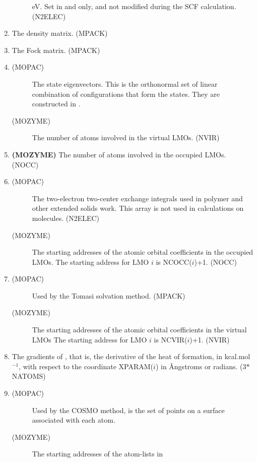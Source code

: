 \begin{enumerate}
\begin{description}
eV. Set in  and  only, and not modified during the
SCF calculation. (N2ELEC)
\end{description}
\item {} The density matrix. (MPACK)
\item {} The Fock matrix. (MPACK)
\item 
\begin{description}
\item[(MOPAC) ] The state eigenvectors.  This is the
orthonormal set of linear combination of configurations that form
the states. They are constructed in . 
\item[(MOZYME) ]
The number of atoms involved in the virtual LMOs.
(NVIR)
\end{description}
\item {\bf (MOZYME) }  The number of atoms involved in the occupied
LMOs. (NOCC)
\item 
\begin{description}
\item[(MOPAC) ] The two-electron two-center exchange integrals used
in polymer and other extended solids work.  This array is not used in
calculations on molecules.  (N2ELEC) 
\item[(MOZYME) ] The starting addresses of the atomic orbital
coefficients in the occupied LMOs.  The starting address for LMO $i$ is
NCOCC($i$)+1. (NOCC)
\end{description}
\item 
\begin{description}
\item[(MOPAC) ] Used by the Tomasi solvation method. (MPACK)
\item[(MOZYME) ] The starting addresses of the atomic orbital
coefficients in the virtual LMOs The starting address for LMO $i$ is
NCVIR($i$)+1. (NVIR)
\end{description}
\item {} The gradients of , that is, the derivative
of the heat of formation, in kcal.mol$^{-1}$, with respect to the coordinate
XPARAM($i$) in \AA ngstroms or radians. (3$*$NATOMS)
\item 
\begin{description}
\item[(MOPAC) ] Used by the COSMO method,  is the set
of points on a surface associated with each atom.
\item[(MOZYME) ]  The starting addresses of the atom-lists in 

\end{description}
\end{enumerate}
